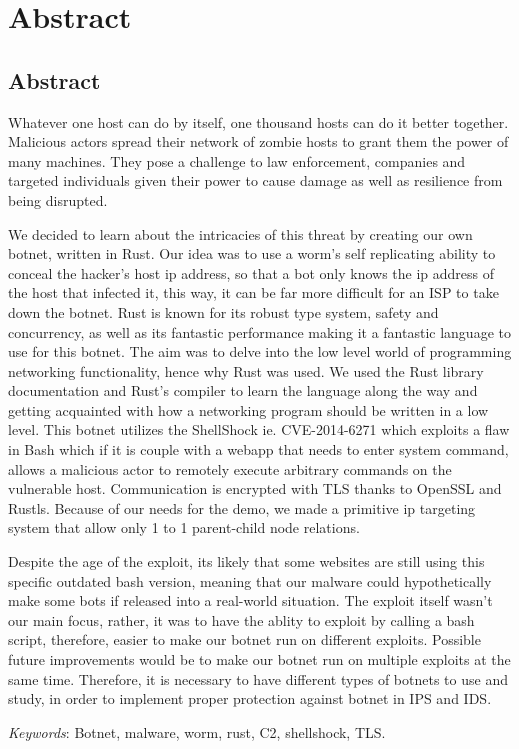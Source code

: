 \documentclass[../main.tex]{subfiles}
\begin{document}
    \newpage

	\chapter*{Abstract}

    \section*{Abstract}

    Whatever one host can do by itself, one thousand hosts can do it better together. 
    Malicious actors spread their network of zombie hosts to grant them the power of many machines.
    They pose a challenge to law enforcement, companies and targeted individuals given their power to cause damage as well as resilience from being disrupted.

    We decided to learn about the intricacies of this threat by creating our own botnet, written in Rust. 
    Our idea was to use a worm's self replicating ability to conceal the hacker's host ip address, so that a bot only knows the ip address of the host that infected it, this way, it can be far more difficult for an ISP to take down the botnet.
    Rust is known for its robust type system, safety and concurrency, as well as its fantastic performance making it a fantastic language to use for this botnet.
    The aim was to delve into the low level world of programming networking functionality, hence why Rust was used. 
    We used the Rust library documentation and Rust's compiler to learn the language along the way and getting acquainted with how a networking program should be written in a low level.
    This botnet utilizes the ShellShock ie. CVE-2014-6271 which exploits a flaw in Bash which if it is couple with a webapp that needs to enter system command, allows a malicious actor to remotely execute arbitrary commands on the vulnerable host.
    Communication is encrypted with TLS thanks to OpenSSL and Rustls. 
    Because of our needs for the demo, we made a primitive ip targeting system that allow only 1 to 1 parent-child node relations.

    Despite the age of the exploit, its likely that some websites are still using this specific outdated bash version, meaning that our malware could hypothetically make some bots if released into a real-world situation. 
    The exploit itself wasn't our main focus, rather, it was to have the ablity to exploit by calling a bash script, therefore, easier to make our botnet run on different exploits. 
    Possible future improvements would be to make our botnet run on multiple exploits at the same time.
    Therefore, it is necessary to have different types of botnets to use and study, in order to implement proper protection against botnet in IPS and IDS.


	\vspace{10pt}

	\qquad \textit{Keywords}: Botnet, malware, worm, rust, C2, shellshock, TLS.
\end{document}
